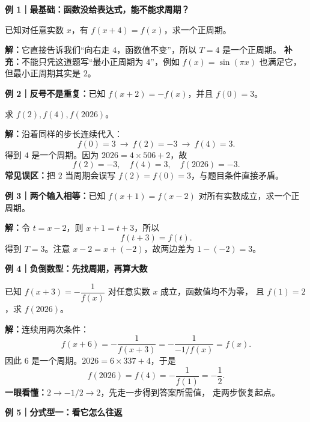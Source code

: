 \clearpage
\begin{examplebox}
\textbf{例 1｜最基础：函数没给表达式，能不能求周期？}



已知对任意实数 $x$，有 $f(x+4)=f(x)$，求一个正周期。

\textbf{解：}它直接告诉我们“向右走 $4$，函数值不变”，所以 $\boxed{T=4}$ 是一个正周期。
\textbf{补充：}不能只凭这道题写“最小正周期为 $4$”，例如 $f(x)=\sin(\pi x)$ 也满足它，
但最小正周期其实是 $2$。

\medskip
\end{examplebox}\clearpage\begin{examplebox}\textbf{例 2｜反号不是重复：}已知 $f(x+2)=-f(x)$，并且 $f(0)=3$。


求 $f(2),f(4),f(2026)$。

\textbf{解：}沿着同样的步长连续代入：
\[
 f(0)=3\ \longrightarrow\ f(2)=-3
 \ \longrightarrow\ f(4)=3.
\]
得到 $4$ 是一个周期。因为 $2026=4\times506+2$，故
\[
\boxed{f(2)=-3,\quad f(4)=3,\quad f(2026)=-3.}
\]
\textbf{常见误区：}把 $2$ 当周期会误写 $f(2)=f(0)=3$，与题目条件直接矛盾。

\medskip
\end{examplebox}\clearpage\begin{examplebox}\textbf{例 3｜两个输入相等：}已知 $f(x+1)=f(x-2)$ 对所有实数成立，求一个正周期。



\textbf{解：}令 $t=x-2$，则 $x+1=t+3$，所以
\[f(t+3)=f(t).\]
得到 $\boxed{T=3}$。注意 $x-2=x+(-2)$，故两边差为 $1-(-2)=3$。

\end{examplebox}\clearpage\begin{examplebox}\textbf{例 4｜负倒数型：先找周期，再算大数}



已知 $f(x+3)=-\dfrac1{f(x)}$ 对任意实数 $x$ 成立，函数值均不为零，
且 $f(1)=2$，求 $f(2026)$。

\textbf{解：}连续用两次条件：
\[
 f(x+6)=-\frac1{f(x+3)}=-\frac1{-1/f(x)}=f(x).
\]
因此 $6$ 是一个周期。$2026=6\times337+4$，于是
\[
 f(2026)=f(4)=-\frac1{f(1)}=\boxed{-\frac12}.
\]
\textbf{一眼看懂：}$2\to-1/2\to2$，先走一步得到答案所需值，
走两步恢复起点。

\medskip
\end{examplebox}\clearpage\begin{examplebox}\textbf{例 5｜分式型一：看它怎么往返}




\end{examplebox}
